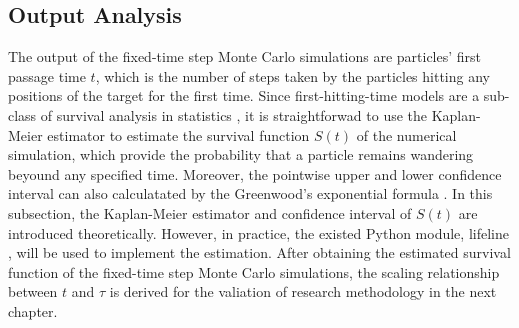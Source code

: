 \subsection{Output Analysis}

The output of the fixed-time step Monte Carlo simulations are particles' first passage time $t$, which is the number of steps taken by the particles hitting any positions of the target for the first time. Since first-hitting-time models are a sub-class of survival analysis in statistics \cite{altman1990practical}, it is straightforwad to use the Kaplan-Meier estimator to estimate the survival function $S(t)$ \cite{kleinbaum2005competing} of the numerical simulation, which provide the probability that a particle remains wandering beyound any specified time. Moreover, the pointwise upper and lower confidence interval can also calculatated by the Greenwood’s exponential formula \cite{hosmer2011applied}. In this subsection, the Kaplan-Meier estimator and confidence interval of $S(t)$ are introduced theoretically. However, in practice, the existed Python module, lifeline \cite{davidson2019lifelines}, will be used to implement the estimation. After obtaining the estimated survival function of the fixed-time step Monte Carlo simulations, the scaling relationship between $t$ and $\tau$ is derived for the valiation of research methodology in the next chapter.
